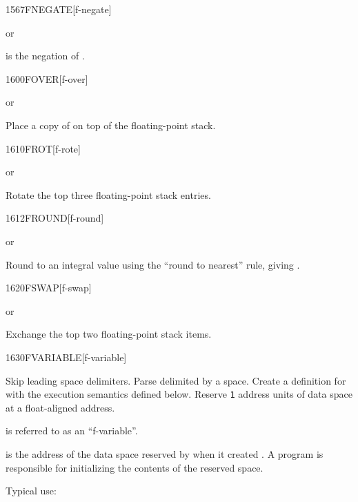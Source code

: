 \begin{worddef}{1567}{FNEGATE}[f-negate]
\item {} or

	 is the negation of .
\end{worddef}

\enlargethispage{8ex}
\begin{worddef}{1600}{FOVER}[f-over]
\item {} or

	Place a copy of  on top of the floating-point stack.
\end{worddef}


\begin{worddef}{1610}{FROT}[f-rote]
\item {} or

	Rotate the top three floating-point stack entries.
\end{worddef}


\begin{worddef}{1612}{FROUND}[f-round]
\item {} or

	Round  to an integral value using the ``round to nearest''
	rule, giving .

\end{worddef}


\begin{worddef}{1620}{FSWAP}[f-swap]
\item {} or

	Exchange the top two floating-point stack items.
\end{worddef}


\begin{worddef}{1630}{FVARIABLE}[f-variable]
\item {}

	Skip leading space delimiters. Parse  delimited by a
	space. Create a definition for  with the execution
	semantics defined below. Reserve \texttt{1} 
	address units of data space at a float-aligned address.

	 is referred to as an ``f-variable''.

\execute[name]

	 is the address of the data space reserved by
	 when it created . A program is
	responsible for initializing the contents of the reserved
	space.


	\begin{rationale} %
		Typical use:
			 
	\end{rationale}
\end{worddef}


